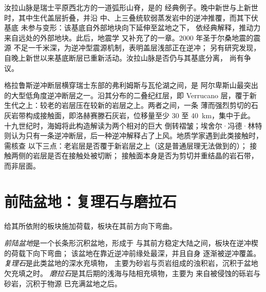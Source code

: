 汝拉山脉是瑞士平原西北方的一道弧形山脊，是的
经典例子。晚中新世与上新世时，其中生代盖层折叠，并沿
中、上三叠统软弱蒸发岩中的逆冲推覆，而其下伏基底
未参与变形：该基底自外部地块向下延伸至盆地之下，
依经典解释，推动力来自远处的外部地块。此后，地震学
又补充了的一章。2000 年圣于尔桑地震的震源
不足一千米深，为逆冲型震源机制，表明盖层浅部正在逆冲；
另有研究发现，自晚上新世以来基底断层已重新活动。汝拉山脉是否仍与其基底分离，
尚有争议。

\begin{inthefield}[读懂逆冲接触]
格拉鲁斯逆冲断层横穿瑞士东部的弗利姆斯与瓦伦湖之间，是
阿尔卑斯山最突出的大型低角度逆冲断层之一。沿其分布的二叠纪红层，即
Verrucano 层，覆于新生代之上：较老的岩层压在较新的岩层之上。两者之间，一条
薄而强烈剪切的石灰岩带构成接触面，即洛赫赛滕石灰岩，位移量至少 30 至 \qty{40}{km}，集中于此。
十九世纪时，海姆将此构造解读为两个相对的巨大
倒转褶皱；埃舍尔·冯德·林特则认为只有一条逆冲断层，后一种逆冲解释占了上风。地质学家遇到此类接触时，需核查
以下三点：老岩层是否覆于新岩层之上（这是普通层理无法做到的）；
接触两侧的岩层是否在接触处被切断；
接触面本身是否为剪切并重结晶的岩石带，而非层面。
\end{inthefield}

\section{前陆盆地：复理石与磨拉石}\label{sec:b2:alpine-orogen:foreland}

给其所依附的板块施加荷载，板块在其前方向下弯曲。

\begin{definition}\label{def:b2:alpine-orogen:foreland}
\emph{前陆盆地}是一个长条形沉积盆地，形成于
与其前方稳定大陆之间，板块在逆冲楔的荷载下向下弯曲；
该盆地在靠近逆冲前缘处最深，并且自身
逐渐被逆冲覆盖。\emph{复理石}是此类盆地的深水充填物，
主要为砂岩与页岩组成的浊积岩，沉积于盆地欠充填之时。
\emph{磨拉石}是其后期的浅海与陆相充填物，主要为
来自被侵蚀的砾岩与砂岩，沉积于物源
已充满盆地之后。
\end{definition}

